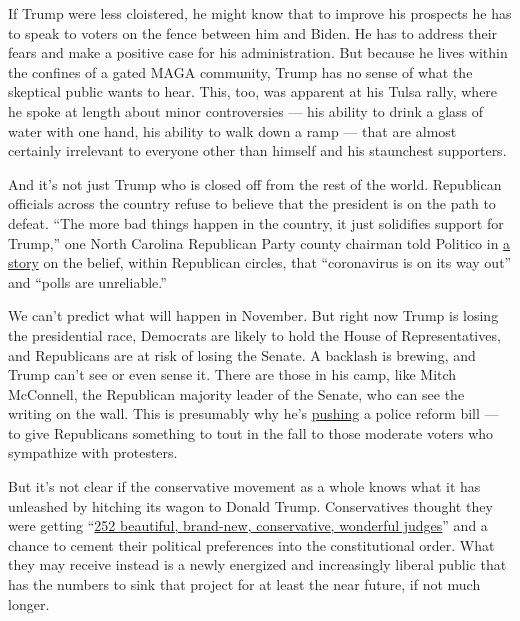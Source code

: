 If Trump were less cloistered, he might know that to improve his
prospects he has to speak to voters on the fence between him and Biden.
He has to address their fears and make a positive case for his
administration. But because he lives within the confines of a gated MAGA
community, Trump has no sense of what the skeptical public wants to
hear. This, too, was apparent at his Tulsa rally, where he spoke at
length about minor controversies --- his ability to drink a glass of
water with one hand, his ability to walk down a ramp --- that are almost
certainly irrelevant to everyone other than himself and his staunchest
supporters.

And it's not just Trump who is closed off from the rest of the world.
Republican officials across the country refuse to believe that the
president is on the path to defeat. ``The more bad things happen in the
country, it just solidifies support for Trump,'' one North Carolina
Republican Party county chairman told Politico in
\href{https://www.politico.com/news/2020/06/15/trump-glide-reelection-republican-officials-316457}{a
story} on the belief, within Republican circles, that ``coronavirus is
on its way out'' and ``polls are unreliable.''

We can't predict what will happen in November. But right now Trump is
losing the presidential race, Democrats are likely to hold the House of
Representatives, and Republicans are at risk of losing the Senate. A
backlash is brewing, and Trump can't see or even sense it. There are
those in his camp, like Mitch McConnell, the Republican majority leader
of the Senate, who can see the writing on the wall. This is presumably
why he's
\href{https://www.cbsnews.com/news/watch-live-mcconnell-tim-scott-senate-republican-police-reform-bill/}{pushing}
a police reform bill --- to give Republicans something to tout in the
fall to those moderate voters who sympathize with protesters.

But it's not clear if the conservative movement as a whole knows what it
has unleashed by hitching its wagon to Donald Trump. Conservatives
thought they were getting
``\href{https://www.whitehouse.gov/briefings-statements/remarks-president-trump-air-force-one-departure-15/}{252
beautiful, brand-new, conservative, wonderful judges}'' and a chance to
cement their political preferences into the constitutional order. What
they may receive instead is a newly energized and increasingly liberal
public that has the numbers to sink that project for at least the near
future, if not much longer.

